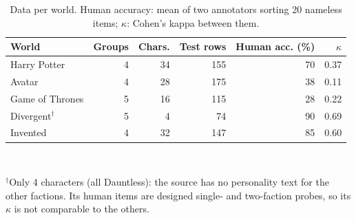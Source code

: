 \begin{table}[t]
\centering\footnotesize
\caption{Data per world. Human accuracy: mean of two annotators sorting 20 nameless items; $\kappa$: Cohen's kappa between them.}
\label{tab:data}
\begin{tabular}{lrrrrr}
\toprule
World & Groups & Chars. & Test rows & Human acc. (\%) & $\kappa$ \\
\midrule
Harry Potter & 4 & 34 & 155 & 70 & 0.37 \\
Avatar & 4 & 28 & 175 & 38 & 0.11 \\
Game of Thrones & 5 & 16 & 115 & 28 & 0.22 \\
Divergent$^\dagger$ & 5 & 4 & 74 & 90 & 0.69 \\
Invented & 4 & 32 & 147 & 85 & 0.60 \\
\bottomrule
\end{tabular}
\\[2pt]\parbox{\columnwidth}{\scriptsize $^\dagger$Only 4 characters (all Dauntless): the source has no personality text for the other factions. Its human items are designed single- and two-faction probes, so its $\kappa$ is not comparable to the others.}
\end{table}
